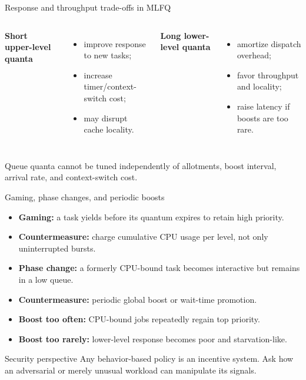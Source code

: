 \documentclass[aspectratio=169,11pt]{beamer}
\begin{document}
\begin{frame}{Response and throughput trade-offs in MLFQ}
  \begin{columns}[T,onlytextwidth]
      \textbf{Short upper-level quanta}
      \begin{itemize}
        \item improve response to new tasks;
        \item increase timer/context-switch cost;
        \item may disrupt cache locality.
      \end{itemize}
      \textbf{Long lower-level quanta}
      \begin{itemize}
        \item amortize dispatch overhead;
        \item favor throughput and locality;
        \item raise latency if boosts are too rare.
      \end{itemize}
  \end{columns}
  \begin{tcolorbox}[title=Parameter interaction,colback=ospurple!5,colframe=ospurple!65]
    Queue quanta cannot be tuned independently of allotments, boost interval, arrival rate, and context-switch cost.
  \end{tcolorbox}
\end{frame}

\begin{frame}{Gaming, phase changes, and periodic boosts}
  \begin{itemize}
    \item \textbf{Gaming:} a task yields before its quantum expires to retain high priority.
    \item \textbf{Countermeasure:} charge cumulative CPU usage per level, not only uninterrupted bursts.
    \item \textbf{Phase change:} a formerly CPU-bound task becomes interactive but remains in a low queue.
    \item \textbf{Countermeasure:} periodic global boost or wait-time promotion.
    \item \textbf{Boost too often:} CPU-bound jobs repeatedly regain top priority.
    \item \textbf{Boost too rarely:} lower-level response becomes poor and starvation-like.
  \end{itemize}
  \begin{alertblock}{Security perspective}
    Any behavior-based policy is an incentive system. Ask how an adversarial or merely unusual workload can manipulate its signals.
  \end{alertblock}
\end{frame}
\end{document}
